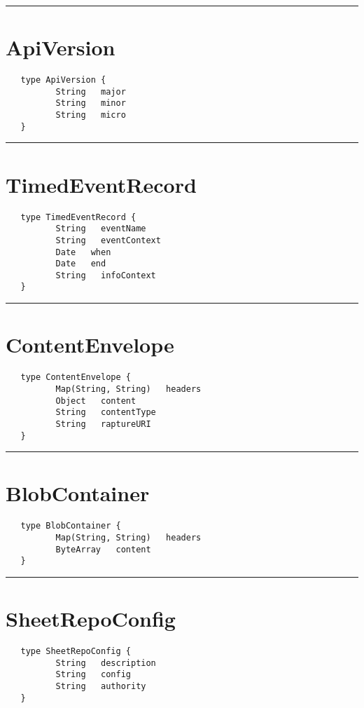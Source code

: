 \rule{15cm}{2pt}
\section{ApiVersion}
\label{type:ApiVersion}

\begin{verbatim}
   type ApiVersion {
          String   major
          String   minor
          String   micro
   }
\end{verbatim}

\rule{15cm}{2pt}
\section{TimedEventRecord}
\label{type:TimedEventRecord}

\begin{verbatim}
   type TimedEventRecord {
          String   eventName
          String   eventContext
          Date   when
          Date   end
          String   infoContext
   }
\end{verbatim}

\rule{15cm}{2pt}
\section{ContentEnvelope}
\label{type:ContentEnvelope}

\begin{verbatim}
   type ContentEnvelope {
          Map(String, String)   headers
          Object   content
          String   contentType
          String   raptureURI
   }
\end{verbatim}

\rule{15cm}{2pt}
\section{BlobContainer}
\label{type:BlobContainer}

\begin{verbatim}
   type BlobContainer {
          Map(String, String)   headers
          ByteArray   content
   }
\end{verbatim}

\rule{15cm}{2pt}
\section{SheetRepoConfig}
\label{type:SheetRepoConfig}

\begin{verbatim}
   type SheetRepoConfig {
          String   description
          String   config
          String   authority
   }
\end{verbatim}


